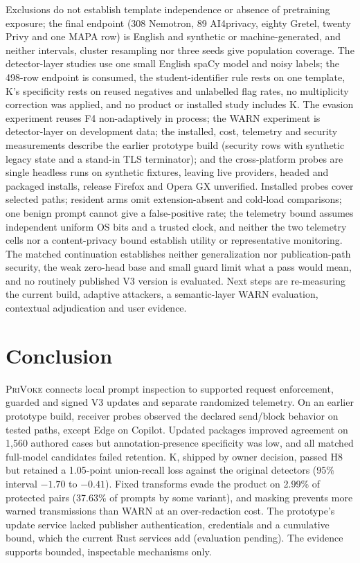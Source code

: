 \documentclass[sigconf]{acmart}
\theoremstyle{acmdefinition}\newtheorem{property}{Property}
\newcommand{\privoke}{\textsc{PriVoke}\xspace}
\newcommand{\pendingStageThirteen}[1]{#1}
\begin{document}
Exclusions do not establish template independence or absence of pretraining exposure; the final endpoint (308 Nemotron, 89 AI4privacy, eighty Gretel, twenty Privy and one MAPA row) is English and synthetic or machine-generated, and neither intervals, cluster resampling nor three seeds give population coverage. The detector-layer studies use one small English spaCy model and noisy labels; the 498-row endpoint is consumed, the student-identifier rule rests on one template, K's specificity rests on reused negatives and unlabelled flag rates, no multiplicity correction was applied, and no product or installed study includes K. The evasion experiment reuses F4 non-adaptively in process; the WARN experiment is detector-layer on development data; the installed, cost, telemetry and security measurements describe the earlier prototype build (security rows with synthetic legacy state and a stand-in TLS terminator); and the cross-platform probes are single headless runs on synthetic fixtures, leaving live providers, headed and packaged installs, release Firefox and Opera GX unverified. Installed probes cover selected paths; resident arms omit extension-absent and cold-load comparisons; one benign prompt cannot give a false-positive rate; the telemetry bound assumes independent uniform OS bits and a trusted clock, and neither the two telemetry cells nor a content-privacy bound establish utility or representative monitoring. The matched continuation establishes neither generalization nor publication-path security, the weak zero-head base and small guard limit what a pass would mean, and no routinely published V3 version is evaluated. Next steps are re-measuring the current build, adaptive attackers, a semantic-layer WARN evaluation, contextual adjudication and user evidence.

\section{Conclusion}
\label{sec:conclusion}
\privoke connects local prompt inspection to supported request enforcement, guarded and signed V3 updates and separate randomized telemetry. On an earlier prototype build, receiver probes observed the declared send/block behavior on tested paths, except Edge on Copilot. Updated packages improved agreement on 1,560 authored cases but annotation-presence specificity was low, and all matched full-model candidates failed retention. K, shipped by owner decision, passed H8 but retained a 1.05-point union-recall loss against the original detectors (95\% interval $-1.70$ to $-0.41$). Fixed transforms evade the product on 2.99\% of protected pairs (37.63\% of prompts by some variant), and masking prevents more warned transmissions than WARN at an over-redaction cost. The prototype's update service lacked publisher authentication, credentials and a cumulative bound, which the current Rust services add (\pendingStageThirteen{evaluation pending}). The evidence supports bounded, inspectable mechanisms only.
\end{document}

